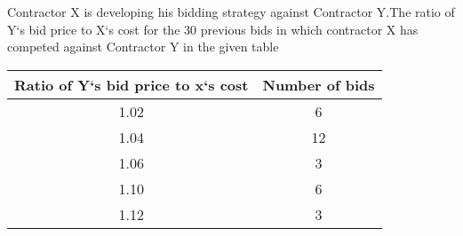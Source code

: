 \iffalse
\title{Assignment}
\author{EE24BTECH11038}
\section{ce}
\chapter{2021}
\fi
\item Contractor X is developing his bidding strategy against Contractor Y.The  ratio of Y`s bid price to X`s cost for the 30 previous bids in which contractor X has competed against Contractor Y in the given table 

\begin{tabular}{|c|c|}
\hline
\textbf{Ratio of Y`s bid price to x`s cost} & \textbf{Number of bids} \\
\hline
1.02 & 6\\
\hline
1.04 & 12\\
\hline
1.06 & 3\\
\hline 
1.10 & 6\\
\hline 
1.12 & 3\\
\hline
\end{tabular}

